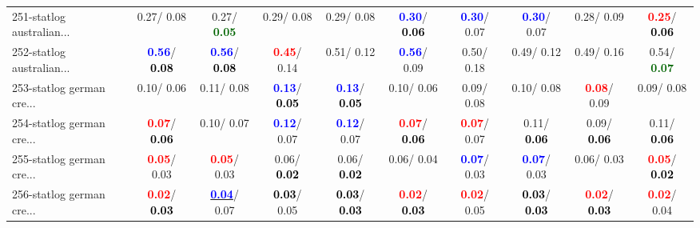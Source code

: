 \begin{table}[h]
\begin{center}
{\begin{tabular}{lc|c|c|c|c|c|c|c|c}
251-statlog australian... &   0.27/  0.08 &   0.27/\textcolor{darkgreen}{\textbf{  0.05}} &   0.29/  0.08 &   0.29/  0.08 & \textcolor{blue}{\textbf{  0.30}}/\textcolor{black}{\textbf{  0.06}} & \textcolor{blue}{\textbf{  0.30}}/  0.07 & \textcolor{blue}{\textbf{  0.30}}/  0.07 &   0.28/  0.09 & \textcolor{red}{\textbf{  0.25}}/\textcolor{black}{\textbf{  0.06}} \\
252-statlog australian... & \textcolor{blue}{\textbf{  0.56}}/\textcolor{black}{\textbf{  0.08}} & \textcolor{blue}{\textbf{  0.56}}/\textcolor{black}{\textbf{  0.08}} & \textcolor{red}{\textbf{  0.45}}/  0.14 &   0.51/  0.12 & \textcolor{blue}{\textbf{  0.56}}/  0.09 &   0.50/  0.18 &   0.49/  0.12 &   0.49/  0.16 &   0.54/\textcolor{darkgreen}{\textbf{  0.07}} \\ \hline
253-statlog german cre... &   0.10/  0.06 &   0.11/  0.08 & \textcolor{blue}{\textbf{  0.13}}/\textcolor{black}{\textbf{  0.05}} & \textcolor{blue}{\textbf{  0.13}}/\textcolor{black}{\textbf{  0.05}} &   0.10/  0.06 &   0.09/  0.08 &   0.10/  0.08 & \textcolor{red}{\textbf{  0.08}}/  0.09 &   0.09/  0.08 \\
254-statlog german cre... & \textcolor{red}{\textbf{  0.07}}/\textcolor{black}{\textbf{  0.06}} &   0.10/  0.07 & \textcolor{blue}{\textbf{  0.12}}/  0.07 & \textcolor{blue}{\textbf{  0.12}}/  0.07 & \textcolor{red}{\textbf{  0.07}}/\textcolor{black}{\textbf{  0.06}} & \textcolor{red}{\textbf{  0.07}}/  0.07 &   0.11/\textcolor{black}{\textbf{  0.06}} &   0.09/\textcolor{black}{\textbf{  0.06}} &   0.11/\textcolor{black}{\textbf{  0.06}} \\
255-statlog german cre... & \textcolor{red}{\textbf{  0.05}}/  0.03 & \textcolor{red}{\textbf{  0.05}}/  0.03 &   0.06/\textcolor{black}{\textbf{  0.02}} &   0.06/\textcolor{black}{\textbf{  0.02}} &   0.06/  0.04 & \textcolor{blue}{\textbf{  0.07}}/  0.03 & \textcolor{blue}{\textbf{  0.07}}/  0.03 &   0.06/  0.03 & \textcolor{red}{\textbf{  0.05}}/\textcolor{black}{\textbf{  0.02}} \\
256-statlog german cre... & \textcolor{red}{\textbf{  0.02}}/\textcolor{black}{\textbf{  0.03}} & \underline{\textcolor{blue}{\textbf{  0.04}}}/  0.07 & \textcolor{black}{\textbf{  0.03}}/  0.05 & \textcolor{black}{\textbf{  0.03}}/\textcolor{black}{\textbf{  0.03}} & \textcolor{red}{\textbf{  0.02}}/\textcolor{black}{\textbf{  0.03}} & \textcolor{red}{\textbf{  0.02}}/  0.05 & \textcolor{black}{\textbf{  0.03}}/\textcolor{black}{\textbf{  0.03}} & \textcolor{red}{\textbf{  0.02}}/\textcolor{black}{\textbf{  0.03}} & \textcolor{red}{\textbf{  0.02}}/  0.04 \\\end{tabular}}\label{stratsALCKappa7AllRedux50a}
\end{center}
\end{table}
